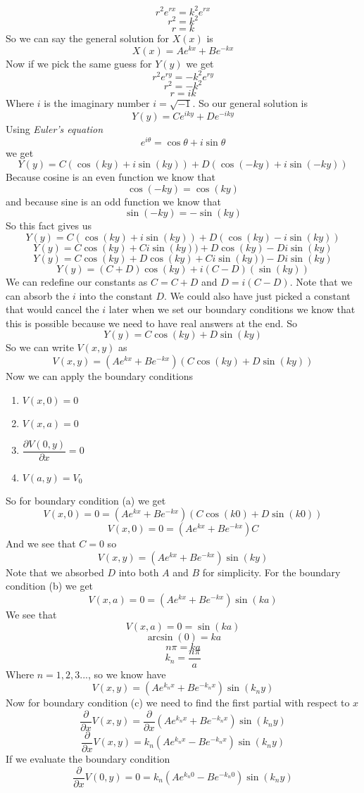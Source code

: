 \documentclass[11pt]{article}
\numberwithin{equation}{section}
\begin{document}
\begin{enumerate}[(i)]
$$r^2e^{rx}=k^2e^{rx}$$
$$r^2=k^2$$
$$r=k$$
So we can say the general solution for $X(x)$ is 
$$X(x) = Ae^{kx}+Be^{-kx}$$
Now if we pick the same guess for $Y(y)$ we get
$$r^2e^{ry}=-k^2e^{ry}$$
$$r^2=-k^2$$
$$r=ik$$
Where $i$ is the imaginary number $i=\sqrt{-1}$. So our general solution is 
$$Y(y) = Ce^{iky}+De^{-iky}$$
Using \emph{Euler's equation}
$$e^{i\theta} = \cos{\theta}+i\sin{\theta}$$ 
we get
$$Y(y) = C(\cos(ky)+i\sin(ky))+D(\cos(-ky)+i\sin(-ky))$$
Because cosine is an even function we know that
$$\cos(-ky)=\cos(ky)$$
and because sine is an odd function we know that
$$\sin(-ky)=-\sin(ky)$$
So this fact gives us
$$Y(y) = C(\cos(ky)+i\sin(ky))+D(\cos(ky)-i\sin(ky))$$
$$Y(y) = C\cos(ky)+Ci\sin(ky))+D\cos(ky)-Di\sin(ky)$$
$$Y(y) = C\cos(ky)+D\cos(ky)+Ci\sin(ky))-Di\sin(ky)$$
$$Y(y) = (C+D)\cos(ky)+i(C-D)(\sin(ky))$$
We can redefine our constants as $C=C+D$ and $D=i(C-D)$. Note that we can absorb the $i$ into the constant $D$. We could also have just picked a constant that would cancel the $i$ later when we set our boundary conditions we know that this is possible because we need to have real answers at the end. So
$$Y(y) = C\cos(ky)+D\sin(ky)$$
So we can write $V(x,y)$ as
$$V(x,y)=\left(Ae^{kx}+Be^{-kx}\right)\left(C\cos(ky)+D\sin(ky)\right)$$
Now we can apply the boundary conditions 
\begin{enumerate}
\item $V(x,0)=0$
\item $V(x,a)=0$
\item $\dfrac{\partial V(0,y)}{\partial x}=0$
\item $V(a,y)=V_0$
\end{enumerate}
So for boundary condition (a) we get
$$V(x,0)=0=\left(Ae^{kx}+Be^{-kx}\right)\left(C\cos(k0)+D\sin(k0)\right)$$
$$V(x,0)=0=\left(Ae^{kx}+Be^{-kx}\right)C$$
And we see that $C=0$ so
$$V(x,y)=\left(Ae^{kx}+Be^{-kx}\right)\sin(ky)$$
Note that we absorbed $D$ into both $A$ and $B$ for simplicity. For the boundary condition (b) we get
$$V(x,a)=0=\left(Ae^{kx}+Be^{-kx}\right)\sin(ka)$$
We see that
$$V(x,a)=0=\sin(ka)$$
$$\arcsin(0)=ka$$
$$n\pi=ka$$
$$k_n=\frac{n\pi}{a}$$
Where $n=1,2,3...$, so we know have 
$$V(x,y)=\left(Ae^{k_nx}+Be^{-k_nx}\right)\sin(k_ny)$$
Now for boundary condition (c) we need to find the first partial with respect to $x$
$$\frac{\partial}{\partial x}V(x,y) = \frac{\partial}{\partial x}\left(Ae^{k_nx}+Be^{-k_nx}\right)\sin(k_ny)$$
$$\frac{\partial}{\partial x}V(x,y) = k_n\left(Ae^{k_nx}-Be^{-k_nx}\right)\sin(k_ny)$$
If we evaluate the boundary condition
$$\frac{\partial}{\partial x}V(0,y) =0= k_n\left(Ae^{k_n0}-Be^{-k_n0}\right)\sin(k_ny)$$

\end{enumerate}
\end{document}
